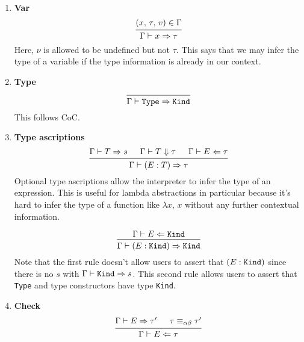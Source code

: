 \documentclass{article}
\begin{document}
\begin{enumerate}
\item \textbf{Var} \\
  \[
    \begin{prooftree}
      \hypo{(x, \, \tau, \, v) \in \Gamma}
      \infer1{\Gamma \vdash x \Rightarrow \tau}
    \end{prooftree}
  \]
  Here, $\nu$ is allowed to be undefined but not $\tau$.
  This says that we may infer the type of a variable if the type information
  is already in our context.

\item \textbf{Type} \\
  \[
    \begin{prooftree}
      \infer0{\Gamma \vdash \Type \Rightarrow \Kind}
    \end{prooftree}
  \]
  This follows CoC.


\item \textbf{Type ascriptions} \\
  \[
    \begin{prooftree}
      \hypo{\Gamma \vdash T \Rightarrow s}
      \hypo{\Gamma \vdash T \Downarrow \tau}
      \hypo{\Gamma \vdash E \Leftarrow \tau}
      \infer3{\Gamma \vdash (E : T) \Rightarrow \tau}
    \end{prooftree}
  \]
  Optional type ascriptions allow the interpreter to infer the type of an
  expression. This is useful for lambda abstractions in particular because it's
  hard to infer the type of a function like $\lambda x, \, x$ without any
  further contextual information.

  \[
    \begin{prooftree}
      \hypo{\Gamma \vdash E \Leftarrow \Kind}
      \infer1{\Gamma \vdash (E : \Kind) \Rightarrow \Kind}
    \end{prooftree}
  \]
  Note that the first rule doesn't allow users to assert that $(E : \texttt{Kind})$
  since there is no $s$ with $\Gamma \vdash \texttt{Kind} \Rightarrow s$.
  This second rule allows users to assert that \verb|Type| and type constructors
  have type \verb|Kind|.

\item \textbf{Check} \\
  \[
    \begin{prooftree}
      \hypo{\Gamma \vdash E \Rightarrow \tau'}
      \hypo{\tau \equiv_{\alpha \beta} \tau'}
      \infer2{\Gamma \vdash E \Leftarrow \tau}
    \end{prooftree}
  \]


\end{enumerate}
\end{document}
